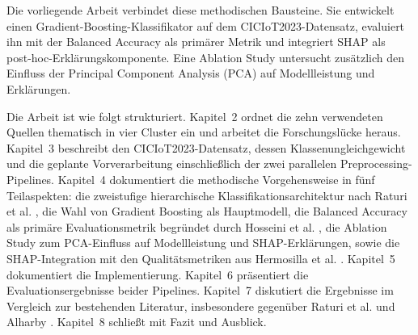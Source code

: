 Die vorliegende Arbeit verbindet diese methodischen Bausteine. Sie entwickelt einen Gradient-Boosting-Klassifikator auf dem CICIoT2023-Datensatz, evaluiert ihn mit der Balanced Accuracy als primärer Metrik und integriert SHAP als post-hoc-Erklärungskomponente. Eine Ablation Study untersucht zusätzlich den Einfluss der Principal Component Analysis (PCA) auf Modellleistung und Erklärungen.

Die Arbeit ist wie folgt strukturiert. Kapitel~2 ordnet die zehn verwendeten Quellen thematisch in vier Cluster ein und arbeitet die Forschungslücke heraus. Kapitel~3 beschreibt den CICIoT2023-Datensatz, dessen Klassenungleichgewicht und die geplante Vorverarbeitung einschließlich der zwei parallelen Preprocessing-Pipelines. Kapitel~4 dokumentiert die methodische Vorgehensweise in fünf Teilaspekten: die zweistufige hierarchische Klassifikationsarchitektur nach Raturi et al. \cite{raturi2026exploratory}, die Wahl von Gradient Boosting als Hauptmodell, die Balanced Accuracy als primäre Evaluationsmetrik begründet durch Hosseini et al. \cite{hosseini2025imbalance}, die Ablation Study zum PCA-Einfluss auf Modellleistung und SHAP-Erklärungen, sowie die SHAP-Integration mit den Qualitätsmetriken aus Hermosilla et al. \cite{hermosilla2025xai_forensic}. Kapitel~5 dokumentiert die Implementierung. Kapitel~6 präsentiert die Evaluationsergebnisse beider Pipelines. Kapitel~7 diskutiert die Ergebnisse im Vergleich zur bestehenden Literatur, insbesondere gegenüber Raturi et al. \cite{raturi2026exploratory} und Alharby \cite{alharby2025ciciot}. Kapitel~8 schließt mit Fazit und Ausblick.
